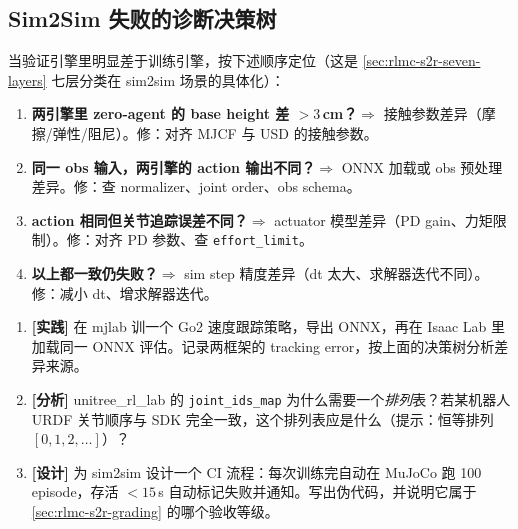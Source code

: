 \subsection{Sim2Sim 失败的诊断决策树}
\label{sec:rlmc-s2r-sim2sim-debug}

当验证引擎里明显差于训练引擎，按下述顺序定位（这是 \cref{sec:rlmc-s2r-seven-layers} 七层分类在 sim2sim 场景的具体化）：

\begin{enumerate}
  \item \textbf{两引擎里 zero-agent 的 base height 差 $>3$\,cm？}$\Rightarrow$ 接触参数差异（摩擦/弹性/阻尼）。修：对齐 MJCF 与 USD 的接触参数。
  \item \textbf{同一 obs 输入，两引擎的 action 输出不同？}$\Rightarrow$ ONNX 加载或 obs 预处理差异。修：查 normalizer、joint order、obs schema。
  \item \textbf{action 相同但关节追踪误差不同？}$\Rightarrow$ actuator 模型差异（PD gain、力矩限制）。修：对齐 PD 参数、查 \verb|effort_limit|。
  \item \textbf{以上都一致仍失败？}$\Rightarrow$ sim step 精度差异（dt 太大、求解器迭代不同）。修：减小 dt、增求解器迭代。
\end{enumerate}


\begin{practice}
\begin{enumerate}
  \item \textbf{[实践]} 在 mjlab 训一个 Go2 速度跟踪策略，导出 ONNX，再在 Isaac Lab 里加载同一 ONNX 评估。记录两框架的 tracking error，按上面的决策树分析差异来源。
  \item \textbf{[分析]} unitree\_rl\_lab 的 \verb|joint_ids_map| 为什么需要一个\emph{排列}表？若某机器人 URDF 关节顺序与 SDK 完全一致，这个排列表应是什么（提示：恒等排列 $[0,1,2,\dots]$）？
  \item \textbf{[设计]} 为 sim2sim 设计一个 CI 流程：每次训练完自动在 MuJoCo 跑 100 episode，存活 $<15$\,s 自动标记失败并通知。写出伪代码，并说明它属于 \cref{sec:rlmc-s2r-grading} 的哪个验收等级。
\end{enumerate}
\end{practice}

